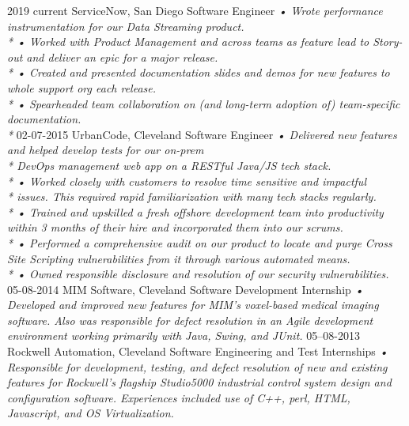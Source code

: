 \documentclass[]{friggeri-cv}
\begin{document}
\begin{entrylist}
  \entry
    {2019 current}
    {ServiceNow, San Diego}
    {Software Engineer}
    {\emph{
    •	Wrote performance instrumentation for our Data Streaming product.\\*
    •	Worked with Product Management and across teams as feature lead to Story-out and deliver an epic for a major release.\\*
    •	Created and presented documentation slides and demos for new features to whole support org each release.\\*
    •	Spearheaded team collaboration on (and long-term adoption of) team-specific documentation. \\*
    }}
  \entry
    {02-07-2015}
    {UrbanCode, Cleveland}
    {Software Engineer}
    {\emph{
    •	Delivered new features and helped develop tests for our on-prem \\* DevOps management web app on a RESTful Java/JS tech stack.\\*
    •	Worked closely with customers to resolve time sensitive and impactful\\* issues. This required rapid familiarization with many tech stacks regularly.\\*
    •	Trained and upskilled a fresh offshore development team into productivity within 3 months of their hire and incorporated them into our scrums. \\*
    •	Performed a comprehensive audit on our product to locate and purge Cross Site Scripting vulnerabilities from it through various automated means.\\*
    •	Owned responsible disclosure and resolution of our security vulnerabilities.}}
  \entry
    {05-08-2014}
    {MIM Software, Cleveland}
    {Software Development Internship}
    {\emph{
    •	Developed and improved new features for MIM's voxel-based medical imaging software. Also was responsible for defect resolution in an Agile development environment working primarily with Java, Swing, and JUnit.}}
  \entry
    {05–08-2013}
    {Rockwell Automation, Cleveland}
    {Software Engineering and Test Internships}
    {\emph{
    •	Responsible for development, testing, and defect resolution of new and existing features for Rockwell’s flagship Studio5000 industrial control system design and configuration software.  Experiences included use of C++, perl, HTML, Javascript, and OS Virtualization.}}
\end{entrylist}
\end{document}
